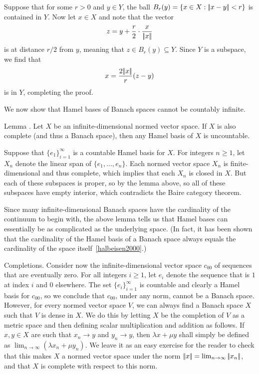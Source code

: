 \proof Suppose that for some $r>0$ and $y\in Y$, the ball $B_r(y) = \{x\in X : |\!|x-y|\!| < r\}$ is contained
in $Y$. Now let $x\in X$ and note that the vector
$$z = y + {r\over 2}\cdot{x\over|\!|x|\!|}$$
is at distance $r/2$ from $y$, meaning that $z\in B_r(y)\subseteq Y$. Since $Y$ is a subspace, we find that
$$x = {2|\!|x|\!|\over r}(z-y)$$
is in $Y$, completing the proof.\slug

We now show that Hamel bases of Banach spaces cannot be countably infinite.

\proclaim Lemma \advthm. Let $X$ be an infinite-dimensional normed vector space. If $X$ is also complete
(and thus a Banach space), then any Hamel basis of $X$ is uncountable.

\proof Suppose that $\{e_1\}_{i=1}^\infty$ is a countable Hamel basis for $X$. For integers $n\ge 1$,
let $X_n$ denote the linear span of $\{e_1,\ldots,e_n\}$. Each normed vector space $X_n$ is finite-dimensional
and thus complete, which implies that each $X_n$ is closed in $X$. But each of these subspaces is proper,
so by the lemma above, so all of these subspaces have empty interior, which contradicts the Baire category
theorem.\slug

Since many infinite-dimensional
Banach spaces have the cardinality of the continuum to begin with,
the above lemma tells us that Hamel bases can essentially be as complicated as the underlying space.
(In fact, it has been shown that
the cardinality of the Hamel basis of a Banach space always equals the cardinality of the space
itself~\ref{halbeisen2000}.)

\medskip\boldlabel Completions.
Consider now the infinite-dimensional vector space $c_{00}$ of sequences that are eventually zero. For all
integers $i\ge 1$, let $e_i$ denote the sequence that is $1$ at index $i$ and $0$ elsewhere. The set
$\{e_i\}_{i=1}^\infty$ is countable and clearly
a Hamel basis for $c_{00}$, so we conclude that $c_{00}$, under any norm, cannot be a Banach space. However,
for every normed vector space $V$, we can always find a Banach space $X$ such that $V$ is dense in $X$.
We do this by letting $X$ be the completion of $V$ as a metric space and then defining scalar multiplication
and addition as follows. If $x,y\in X$ are such that $x_n\to y$ and $y_n\to y$, then $\lambda x+\mu y$
shall simply be defined as $\lim_{n\to \infty} (\lambda x_n + \mu y_n)$. We leave it as an easy exercise
for the reader to check
that this makes $X$ a normed vector space under the norm $|\!|x|\!| = \lim_{n\to\infty}|\!|x_n|\!|$, and that
$X$ is complete with respect to this norm.

